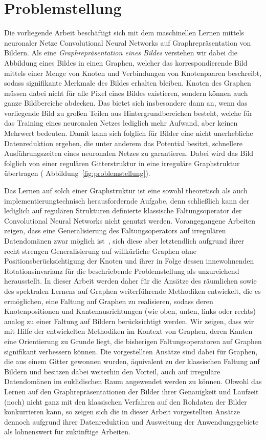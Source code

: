 \section{Problemstellung}
\label{problemstellung}

Die vorliegende Arbeit beschäftigt sich mit dem maschinellen Lernen mittels neuronaler Netze \bzw{} Convolutional Neural Networks auf Graphrepräsentation von Bildern.
Als eine \emph{Graphrepräsentation eines Bildes} verstehen wir dabei die Abbildung eines Bildes in einen Graphen, welcher das korrespondierende Bild mittels einer Menge von Knoten und Verbindungen von Knotenpaaren beschreibt, sodass signifikante Merkmale des Bildes erhalten bleiben.
Knoten des Graphen müssen dabei nicht für alle Pixel eines Bildes existieren, sondern können auch ganze Bildbereiche abdecken.
Das bietet sich insbesondere dann an, wenn das vorliegende Bild zu großen Teilen aus Hintergrundbereichen besteht, welche für das Training eines neuronalen Netzes lediglich mehr Aufwand, aber keinen Mehrwert bedeuten.
Damit kann sich folglich für Bilder eine nicht unerhebliche Datenreduktion ergeben, die unter anderem das Potential besitzt, schnellere Ausführungszeiten eines neuronalen Netzes zu garantieren.
Dabei wird das Bild folglich von einer regulären Gitterstruktur in eine irreguläre Graphstruktur übertragen (\vgl{} Abbildung~\ref{fig:problemstellung}).

Das Lernen auf solch einer Graphstruktur ist eine sowohl theoretisch als auch implementierungtechnisch herausfordernde Aufgabe, denn schließlich kann der lediglich auf regulären Strukturen definierte klassische Faltungsoperator der Convolutional Neural Networks nicht genutzt werden.
Vorangegangene Arbeiten zeigen, dass eine Generalisierung des Faltungsoperators auf irregulären Datendomänen zwar möglich ist~\cite{patchy, Defferrard, gcn}, sich diese aber letztendlich aufgrund ihrer recht strengen Generalisierung auf willkürliche Graphen ohne Positionsberücksichtigung der Knoten und ihrer in Folge dessen innewohnenden Rotationsinvarianz für die beschriebende Problemstellung als unzureichend herausstellt.
In dieser Arbeit werden daher für die Ansätze des räumlichen sowie des spektralen Lernens auf Graphen weiterführende Methodiken entwickelt, die es ermöglichen, eine Faltung auf Graphen zu realisieren, sodass deren Knotenpositionen und Kantenausrichtungen (wie oben, unten, links oder rechts) analog zu einer Faltung auf Bildern berücksichtigt werden.
Wir zeigen, dass wir mit Hilfe der entwickelten Methodiken im Kontext von Graphen, deren Kanten eine Orientierung zu Grunde liegt, die bisherigen Faltungsoperatoren auf Graphen signifikant verbessern können.
Die vorgestellten Ansätze sind dabei für Graphen, die aus einem Gitter gewonnen wurden, äquivalent zu der klassischen Faltung auf Bildern und besitzen dabei weiterhin den Vorteil, auch auf irreguläre Datendomänen im euklidischen Raum angewendet werden zu können.
Obwohl das Lernen auf den Graphrepräsentationen der Bilder \bzgl{} ihrer Genauigkeit und Laufzeit (noch) nicht ganz mit den klassischen Verfahren auf den Rohdaten der Bilder konkurrieren kann, so zeigen sich die in dieser Arbeit vorgestellten Ansätze dennoch aufgrund ihrer Datenreduktion und Ausweitung der Anwendungsgebiete als lohnenswert für zukünftige Arbeiten.
